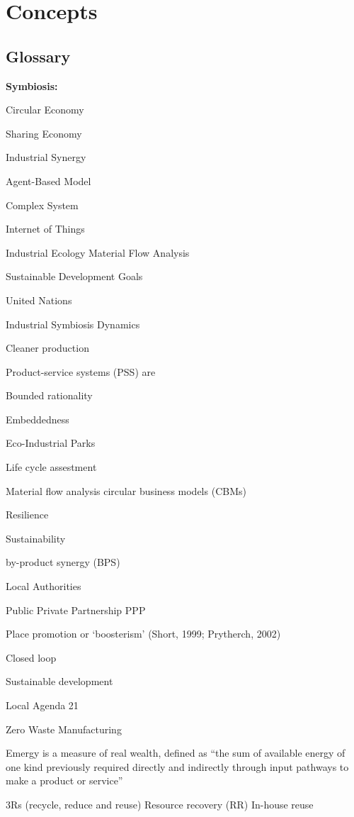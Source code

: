 \section{Concepts}


\subsection{Glossary}

\textbf{Symbiosis: }

Circular Economy

Sharing Economy

Industrial Synergy

Agent-Based Model

Complex System

Internet of Things


Industrial Ecology
Material Flow Analysis


Sustainable Development Goals


United Nations


Industrial Symbiosis Dynamics

Cleaner production


Product-service systems (PSS) are

Bounded rationality

Embeddedness

Eco-Industrial Parks

Life cycle assestment

Material flow analysis
circular business models (CBMs) 

Resilience

Sustainability

by-product synergy (BPS)

Local Authorities

Public Private Partnership PPP

Place promotion or ‘boosterism’ (Short, 1999; Prytherch, 2002)


Closed loop 

Sustainable development

Local Agenda 21

Zero Waste Manufacturing 

Emergy is a measure of real wealth, defined as “the sum of available energy of one kind previously required directly and indirectly through input pathways to make a product or service”

3Rs (recycle, reduce and reuse)
Resource recovery (RR)
In-house reuse

